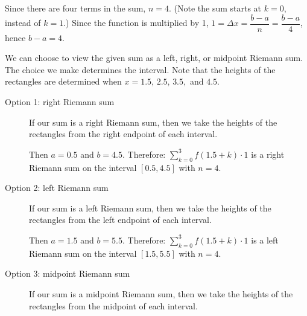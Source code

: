 \begin{solution}
Since there are four terms in the sum, $n=4$. (Note the sum starts at $k=0$, instead of $k=1$.) Since the function is multiplied by 1, $1=\Delta x=\dfrac{b-a}{n}=\dfrac{b-a}{4}$, hence $b-a=4$.

We can choose to view the given sum as a left, right, or midpoint Riemann sum. The choice we make determines the interval. Note that the heights of the rectangles are determined when $x = 1.5,\, 2.5,\, 3.5,$ and $4.5$.
\begin{center}
\end{center}
\begin{description}
\item[Option 1: right Riemann sum]
If our sum is a right Riemann sum, then we take the heights of the rectangles from the right endpoint of each interval.
\begin{center}
\end{center}

Then $a=0.5$ and $b=4.5$. Therefore: $\sum\limits_{k=0}^3 f (1.5 + k) \cdot 1$ is a right Riemann sum on the interval $[0.5,4.5]$ with $n=4$.
\item[Option 2: left Riemann sum]
If our sum is a left Riemann sum, then we take the heights of the rectangles from the left endpoint of each interval.

\begin{center}
\end{center}

Then $a=1.5$ and $b=5.5$. Therefore: $\sum\limits_{k=0}^3 f (1.5 + k) \cdot 1$ is a left Riemann sum on the interval $[1.5,5.5]$ with $n=4$.
\item[Option 3: midpoint Riemann sum]
If our sum is a midpoint Riemann sum, then we take the heights of the rectangles from the midpoint of each interval.


\end{description}
\end{solution}

